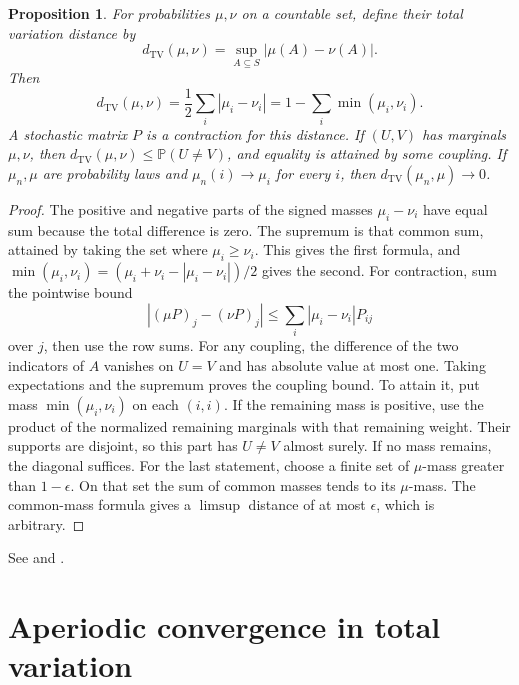 \documentclass[11pt,oneside,openany]{book}
\theoremstyle{plain}
\newtheorem{proposition}[theorem]{Proposition}
\theoremstyle{definition}
\theoremstyle{remark}
\begin{document}
\begin{proposition}
For probabilities \(\mu,\nu\) on a countable set, define their
total variation distance by
\[
 d_{\mathrm{TV}}(\mu,\nu)=\sup_{A\subseteq S}|\mu(A)-\nu(A)|.
\]
Then
\[
 d_{\mathrm{TV}}(\mu,\nu)
   =\frac12\sum_i|\mu_i-\nu_i|
   =1-\sum_i\min(\mu_i,\nu_i).
\]
A stochastic matrix \(P\) is a contraction for this distance.
If \((U,V)\) has marginals \(\mu,\nu\), then
\(d_{\mathrm{TV}}(\mu,\nu)\le \mathbb P(U\ne V)\), and equality is
attained by some coupling. If \(\mu_n,\mu\) are probability laws
and \(\mu_n(i)\to\mu_i\) for every \(i\), then
\(d_{\mathrm{TV}}(\mu_n,\mu)\to0\).
\end{proposition}
\begin{proof}
The positive and negative parts of the signed masses \(\mu_i-\nu_i\)
have equal sum because the total difference is zero. The supremum
is that common sum, attained by taking the set where
\(\mu_i\ge\nu_i\). This gives the first formula, and
\(\min(\mu_i,\nu_i)=(\mu_i+\nu_i-|\mu_i-\nu_i|)/2\) gives the second.
For contraction, sum the pointwise bound
\[
 |(\mu P)_j-(\nu P)_j|
 \le\sum_i|\mu_i-\nu_i|P_{ij}
\]
over \(j\), then use the row sums.
For any coupling, the difference of the two indicators of \(A\)
vanishes on \(U=V\) and has absolute value at most one.
Taking expectations and the supremum proves the coupling bound.
To attain it, put mass \(\min(\mu_i,\nu_i)\) on each \((i,i)\).
If the remaining mass is positive, use the product of the
normalized remaining marginals with that remaining weight.
Their supports are disjoint, so this part has \(U\ne V\)
almost surely. If no mass remains, the diagonal suffices.
For the last statement, choose a finite set of \(\mu\)-mass
greater than \(1-\epsilon\). On that set the sum of common masses
tends to its \(\mu\)-mass. The common-mass formula gives a
\(\limsup\) distance of at most \(\epsilon\), which is arbitrary.
\end{proof}

See \cite[Section 1.8]{Norris} and \cite[Section 5.6]{Durrett}.

\section{Aperiodic convergence in total variation}\label{p207:W16}
\end{document}

